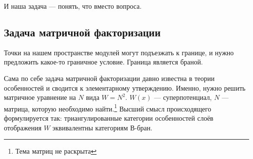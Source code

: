 \documentclass[11pt]{article}
\def\p{\partial}
\theoremstyle{remark}
\theoremstyle{definition}
\newcommand{\que}[1]{\footnote{\textcolor[rgb]{0.38,0.69,0.82}{#1}}}
\begin{document}
\begin{center}

\end{center}

И наша задача --- понять, что вместо вопроса.

\subsection{Задача матричной факторизации}

Точки на нашем пространстве модулей могут подъезжать к границе, и нужно предложить какое-то граничное условие. Граница является браной.

Сама по себе задача матричной факторизации давно известна в теории особенностей и сводится к элементарному утверждению. Именно, нужно решить матричное уравнение на $N$ вида $W = N^2$. $W(x)$ --- суперпотенциал, $N$ --- матрица, которую необходимо найти.\que{Тема матриц не раскрыта} Высший смысл происходящего формулируется так: триангулированные категории особенностей слоёв отображения $W$ эквивалентны категориям В-бран.


\begin{comment}
\footnotesize{}

Общеобразовательный кусок про деформации комплексных структур

$$Q_{\tau} = Q + \tau V_1 + \tau^2 V_2, \bar \p_{\tau} = \bar\p + \tau \mu_1 \p + \tau^2 \mu_2 \p + ...$$

Надо изучать комплексные структуры по модулю диффеоморфизмов. Оказывается, уравнение Кодаиры $$(\bar\p + \mu(\tau) \p)^2 =0$$ можно обобщить. А именно, можно деформировать не только дифференциал $\bar\p$, но и вообще всё что угодно.

В топологической квантовой механике имеем уравнение $$H = \{Q(\tau), G\}.$$

\normalsize{}

\end{comment}
\end{document}
